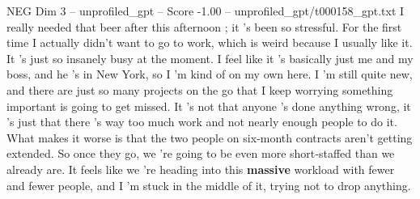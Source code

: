 \begin{textsample}{NEG Dim 3 – unprofiled\_gpt – Score -1.00 – unprofiled\_gpt/t000158\_gpt.txt}  \label{ex:f3_neg_009}
I really needed that beer after this afternoon ; it ’s been so stressful.
For the first time I actually didn't want to go to work, which is weird because I usually like it.
It ’s just so insanely busy at the moment.
I feel like it ’s basically just me and my boss, and he ’s in New York, so I ’m kind of on my own here.
I ’m still quite new, and there are just so many projects on the go that I keep worrying something important is going to get missed.
It ’s not that anyone ’s done anything wrong, it ’s just that there ’s way too much work and not nearly enough people to do it.
What makes it worse is that the two people on six‑month contracts aren't getting extended.
So once they go, we ’re going to be even more short‑staffed than we already are.
It feels like we ’re heading into this \textbf{massive} workload with fewer and fewer people, and I ’m stuck in the middle of it, trying not to drop anything.

\end{textsample}
